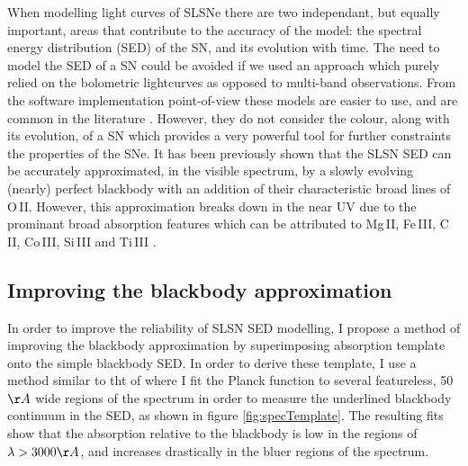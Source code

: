 When modelling light curves of SLSNe there are two independant, but equally important, areas that contribute to the accuracy of the model: the spectral energy distribution (SED) of the SN, and its evolution with time. The need to model the SED of a SN could be avoided if we used an approach which purely relied on the bolometric lightcurves as opposed to multi-band observations. From the software implementation point-of-view these models are easier to use, and are common in the literature \citep{Inserra2013,Papadopuplus2014,Nicholl14}. However, they do not consider the colour, along with its evolution, of a SN which provides a very powerful tool for further constraints the properties of the SNe. It has been previously shown \citep{2011ApJ...743..114C,2013ApJ...779...98H,2015MNRAS.449.1215P,2014ApJ...797...24V} that the SLSN SED can be accurately approximated, in the visible spectrum, by a slowly evolving (nearly) perfect blackbody with an addition of their characteristic broad lines of O\,II. However, this approximation breaks down in the near UV due to the prominant broad absorption features which can be attributed to Mg\,II, Fe\,III, C\,II, Co\,III, Si\,III and Ti\,III \citep[see][for line identifications]{Mazalli2016}.

\subsection{Improving the blackbody approximation}
In order to improve the reliability of SLSN SED modelling, I propose a method of improving the blackbody approximation by superimposing absorption template onto the simple blackbody SED. In order to derive these template, I use a method similar to tht of  \citet{2014ApJ...797...24V} where I fit the Planck function to several featureless, 50$\AA$ wide regions of the spectrum in order to measure the underlined blackbody continuum in the SED, as shown in figure \ref{fig:specTemplate}. The resulting fits show that the absorption relative to the blackbody is low in the regions of $\lambda>3000\AA$, and increases drastically in the bluer regions of the spectrum.

